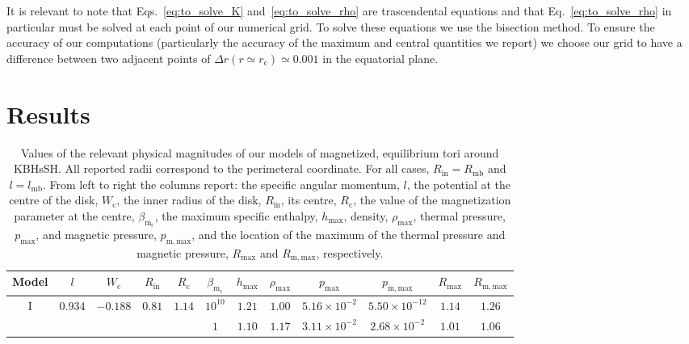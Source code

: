 \documentclass[twocolumn,aps,showpacs,showkeys,prd,superscriptaddress,byrevtex, amsmath]{revtex4-1}
\begin{document}
It is relevant to note that Eqs.~\eqref{eq:to_solve_K} and~\eqref{eq:to_solve_rho} are trascendental equations and that Eq.~\eqref{eq:to_solve_rho} in particular must be solved at each point of our numerical grid. To solve these equations we use the bisection method. To ensure the accuracy of our computations (particularly the accuracy of the maximum and central quantities we report) we choose our grid to have a difference between two adjacent points of $\Delta r (r \simeq r_{\mathrm{c}}) \simeq 0.001$ in the equatorial plane.

\section{Results}
\label{results}

\begin{table}[t]
\caption{Values of the relevant physical magnitudes of our models of magnetized, equilibrium tori around KBHsSH. All reported radii correspond to the perimeteral coordinate. For all cases,  $R_{\mathrm{in}} = R_{\mathrm{mb}}$ and $l = l_{\mathrm{mb}}$. From left to right the columns report: the specific angular momentum, $l$, the potential at the centre of the disk, $W_{\mathrm{c}}$, the inner radius of the disk, $R_{\mathrm{in}}$, its centre, $R_{\mathrm{c}}$, the value of the magnetization parameter at the centre, $\beta_{\mathrm{m_{\mathrm{c}}}}$, the maximum specific enthalpy, $h_{\mathrm{max}}$, density,  $\rho_{\mathrm{max}}$, thermal pressure, $p_{\mathrm{max}}$, and magnetic pressure, $p_{\mathrm{m, max}}$, and the location of the maximum of the thermal pressure and magnetic pressure, $R_{\mathrm{max}}$ and $R_{\mathrm{m, max}}$, respectively.}       
\label{HBH_disk_parameters}      
\centering          
\begin{tabular}{c c c c c  c c c c c c c}
\hline\hline       
 Model & $l$ & $W_{\mathrm{c}}$ & $R_{\mathrm{in}}$ & $R_{\mathrm{c}}$ &  $\beta_{\mathrm{m_{\mathrm{c}}}}$ & $h_{\mathrm{max}}$ & $\rho_{\mathrm{max}}$ & $p_{\mathrm{max}}$ & $p_{\mathrm{m, max}}$ & $R_{\mathrm{max}}$ & $R_{\mathrm{m, max}}$\\ 
\hline           
I & $0.934$ & $-0.188$ & $0.81$ & $1.14$ & $10^{10}$ & $1.21$ & $1.00$ & $5.16 \times 10^{-2}$ & $5.50 \times 10^{-12}$ & $1.14$ & $1.26$\\ 

 &  &  &  &  & $1$ & $1.10$ & $1.17$ & $3.11 \times 10^{-2}$ & $2.68 \times 10^{-2}$ & $1.01$ & $1.06$\\ 


\end{tabular}
\end{table}
\end{document}
